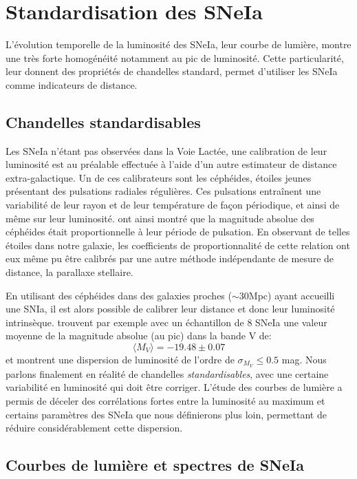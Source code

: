 \documentclass[../main/main.tex]{subfiles}
\begin{document}
\section{Standardisation des SNeIa}

L'évolution temporelle de la luminosité des SNeIa, leur courbe de
lumière, montre une très forte homogénéité notamment au pic de
luminosité. Cette particularité, leur donnent des propriétés de
chandelles standard, permet d'utiliser les SNeIa comme
indicateurs de distance.

\subsection{Chandelles standardisables}
Les SNeIa n'étant pas observées dans la Voie Lactée, une calibration
de leur luminosité est au préalable effectuée à l'aide d'un autre estimateur de
distance extra-galactique.
Un de ces calibrateurs sont les céphéides, étoiles jeunes présentant des
pulsations radiales régulières. Ces pulsations entraînent une
variabilité de leur rayon et de leur température de façon périodique, et
ainsi de même sur leur luminosité. \citet{Leavitt1908, Leavitt1912} ont
ainsi montré que la magnitude absolue des céphéides était
proportionnelle à leur période de pulsation. En observant de telles
étoiles dans notre galaxie, les coefficients de proportionnalité de
cette relation ont eux même pu être calibrés par une autre méthode indépendante
de mesure de distance, la parallaxe stellaire.

En utilisant des céphéides dans des galaxies proches
($\sim30$Mpc) ayant accueilli une SNIa, il est alors possible de
calibrer leur distance et donc leur luminosité
intrinsèque. \citet{Saha1999} trouvent par exemple avec un échantillon
de $8$ SNeIa une valeur moyenne de
la magnitude absolue (au pic) dans la bande V de:
\begin{equation}
  \label{eq:51}
  \langle M_{V}\rangle=-19.48\pm0.07 
\end{equation}
et \citet{Hamuy1995}  montrent une
dispersion de luminosité de l'ordre de $\sigma_{M_{V}}\leq0.5$ mag.
Nous parlons finalement en réalité de chandelles \textit{standardisables}, avec une
certaine variabilité en luminosité qui doit être corriger. L'étude des
courbes de lumière a permis de déceler des corrélations fortes entre la
luminosité au maximum et certains paramètres des SNeIa que nous
définierons plus loin, permettant
de réduire considérablement cette dispersion. 

\subsection{Courbes de lumière et spectres de SNeIa}
\end{document}
